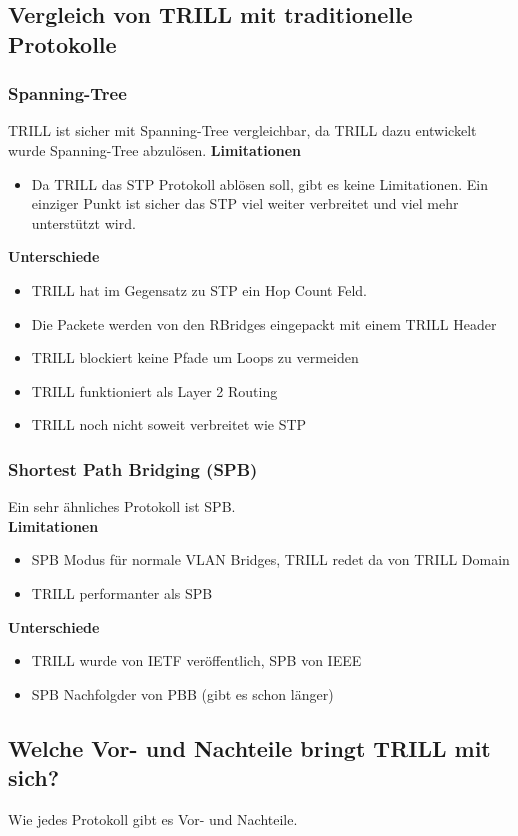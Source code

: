 \documentclass[a4,12pt]{scrartcl}
\begin{document}
\subsection{Vergleich von TRILL mit traditionelle Protokolle}
\subsubsection{Spanning-Tree}
TRILL ist sicher mit Spanning-Tree vergleichbar, da TRILL dazu entwickelt wurde Spanning-Tree abzulösen. \newpage
\textbf{Limitationen}
\begin{itemize}
\item Da TRILL das STP Protokoll ablösen soll, gibt es keine Limitationen. Ein einziger Punkt ist sicher das STP viel weiter verbreitet und viel mehr unterstützt wird. 
\end{itemize}
\textbf{Unterschiede}
\begin{itemize}
\item TRILL hat im Gegensatz zu STP ein Hop Count Feld. 
\item Die Packete werden von den RBridges eingepackt mit einem TRILL Header
\item TRILL blockiert keine Pfade um Loops zu vermeiden 
\item TRILL funktioniert als Layer 2 Routing 
\item TRILL noch nicht soweit verbreitet wie STP 
\end{itemize}

\subsubsection{Shortest Path Bridging (SPB)}
Ein sehr ähnliches Protokoll ist SPB.  \\
\textbf{Limitationen}
\begin{itemize}
\item SPB Modus für normale VLAN Bridges, TRILL redet da von TRILL Domain
\item TRILL performanter als SPB 
\end{itemize}
\textbf{Unterschiede}
\begin{itemize}
\item TRILL wurde von IETF veröffentlich, SPB von IEEE
\item SPB Nachfolgder von PBB (gibt es schon länger) 
\end{itemize}

\subsection{Welche Vor- und Nachteile bringt TRILL mit sich?}
Wie jedes Protokoll gibt es Vor- und Nachteile. 
\end{document}
